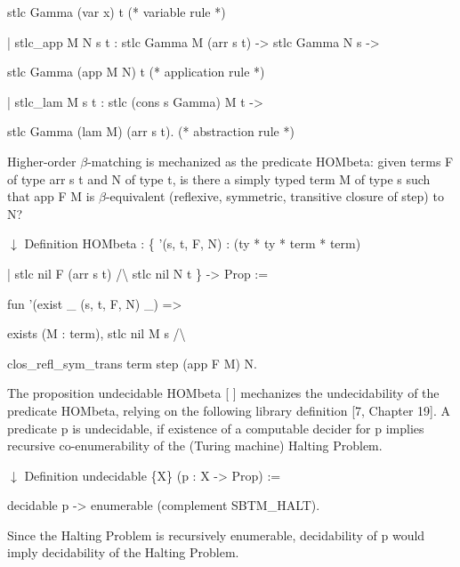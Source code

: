   stlc Gamma (var x) t (* variable rule *) 
 
  | stlc\_app M N s t : stlc Gamma M (arr s t) -> stlc Gamma N s -> 
 
  stlc Gamma (app M N) t (* application rule *) 
 
  | stlc\_lam M s t : stlc (cons s Gamma) M t -> 
 
  stlc Gamma (lam M) (arr s t). (* abstraction rule *) 
  
 
 
Higher-order $\beta$-matching is mechanized as the predicate HOMbeta: given terms F of type arr s t and N of type t, is there a simply typed term M of type s such that app F M is $\beta$-equivalent (reflexive, symmetric, transitive closure of step) to N?\par
  \ensuremath{\downarrow} 
 Definition HOMbeta : \{ ’(s, t, F, N) : (ty * ty * term * term) 
 
  | stlc nil F (arr s t) /\textbackslash{} stlc nil N t \} -> Prop := 
 
  fun ’(exist \_ (s, t, F, N) \_) => 
 
  exists (M : term), stlc nil M s /\textbackslash{} 
 
  clos\_refl\_sym\_trans term step (app F M) N. 
  
 
 
The proposition undecidable HOMbeta [ ] mechanizes the undecidability of the predicate HOMbeta, relying on the following library definition [7, Chapter 19]. A predicate p is undecidable, if existence of a computable decider for p implies recursive co-enumerability of the (Turing machine) Halting Problem.\par
  \ensuremath{\downarrow} 
 Definition undecidable \{X\} (p : X -> Prop) := 
 
  decidable p -> enumerable (complement SBTM\_HALT). 
  
Since the Halting Problem is recursively enumerable, decidability of p would imply decidability of the Halting Problem.\par
 
 
